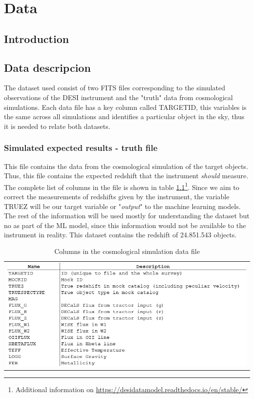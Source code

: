 \chapter{Data}
\label{Ch:Data}

\section{Introduction}


\section{Data descripcion}

The dataset used consist of two FITS files corresponding to the simulated observations of the DESI instrument and the "truth" data from cosmological simulations. Each data file has a key column called TARGETID, this variables is the same across all simulations and identifies a particular object in the sky, thus it is needed to relate both datasets. 
\subsection{Simulated expected results - truth file}
This file contains the data from the cosmological simulation of the target objects. Thus, this file contains the expected redshift that the instrument \textit{should} measure. The complete list of columns in the file is shown in table \ref{tab:true_car}\footnote{Additional information on \url{https://desidatamodel.readthedocs.io/en/stable/}}. Since we aim to correct the measurements of redshifts given by the instrument, the variable TRUEZ will be our target variable or "\textit{output}" to the machine learning models. The rest of the information will be used mostly for understanding the dataset but no as part of the ML model, since this information would not be available to the instrument in reality. This dataset contains the redshift of 24.851.543 objects. 
\begin{table}[!htbp]
	\centering
	\begin{tabular}{c}
		\includegraphics[width=0.9\linewidth]{TeX_files/Imagenes/Imagen2}
	\end{tabular} 
	\caption{Columns in the cosmological simulation data file}
	\label{tab:true_car}
\end{table}
